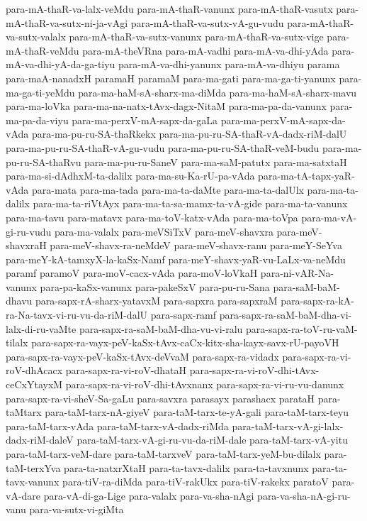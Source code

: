 {para-mA-thaR-va-lalx-veMdu
para-mA-thaR-vanunx
para-mA-thaR-vasutx
para-mA-thaR-va-sutx-ni-ja-vAgi
para-mA-thaR-va-sutx-vA-gu-vudu
para-mA-thaR-va-sutx-valalx
para-mA-thaR-va-sutx-vanunx
para-mA-thaR-va-sutx-vige
para-mA-thaR-veMdu
para-mA-theVRna
para-mA-vadhi
para-mA-va-dhi-yAda
para-mA-va-dhi-yA-da-ga-tiyu
para-mA-va-dhi-yanunx
para-mA-va-dhiyu
parama
para-maA-nanadxH
paramaH
paramaM
para-ma-gati
para-ma-ga-ti-yanunx
para-ma-ga-ti-yeMdu
para-ma-haM-sA-sharx-ma-diMda
para-ma-haM-sA-sharx-mavu
para-ma-loVka
para-ma-na-natx-tAvx-dagx-NitaM
para-ma-pa-da-vanunx
para-ma-pa-da-viyu
para-ma-perxV-mA-sapx-da-gaLa
para-ma-perxV-mA-sapx-da-vAda
para-ma-pu-ru-SA-thaRkekx
para-ma-pu-ru-SA-thaR-vA-dadx-riM-dalU
para-ma-pu-ru-SA-thaR-vA-gu-vudu
para-ma-pu-ru-SA-thaR-veM-budu
para-ma-pu-ru-SA-thaRvu
para-ma-pu-ru-SaneV
para-ma-saM-patutx
para-ma-satxtaH
para-ma-si-dAdhxM-ta-dalilx
para-ma-su-Ka-rU-pa-vAda
para-ma-tA-tapx-yaR-vAda
para-mata
para-ma-tada
para-ma-ta-daMte
para-ma-ta-dalUlx
para-ma-ta-dalilx
para-ma-ta-riVtAyx
para-ma-ta-sa-mamx-ta-vA-gide
para-ma-ta-vanunx
para-ma-tavu
para-matavx
para-ma-toV-katx-vAda
para-ma-toVpa
para-ma-vA-gi-ru-vudu
para-ma-valalx
para-meVSiTxV
para-meV-shavxra
para-meV-shavxraH
para-meV-shavx-ra-neMdeV
para-meV-shavx-ranu
para-meY-SeYva
para-meY-kA-tamxyX-la-kaSx-Namf
para-meY-shavx-yaR-vu-LaLx-va-neMdu
paramf
paramoV
para-moV-cacx-vAda
para-moV-loVkaH
para-ni-vAR-Na-vanunx
para-pa-kaSx-vanunx
para-pakeSxV
para-pu-ru-Sana
para-saM-baM-dhavu
para-sapx-rA-sharx-yatavxM
para-sapxra
para-sapxraM
para-sapx-ra-kA-ra-Na-tavx-vi-ru-vu-da-riM-dalU
para-sapx-ramf
para-sapx-ra-saM-baM-dha-vi-lalx-di-ru-vaMte
para-sapx-ra-saM-baM-dha-vu-vi-ralu
para-sapx-ra-toV-ru-vaM-tilalx
para-sapx-ra-vayx-peV-kaSx-tAvx-caCx-kitx-sha-kayx-savx-rU-payoVH
para-sapx-ra-vayx-peV-kaSx-tAvx-deVvaM
para-sapx-ra-vidadx
para-sapx-ra-vi-roV-dhAcacx
para-sapx-ra-vi-roV-dhataH
para-sapx-ra-vi-roV-dhi-tAvx-ceCxYtayxM
para-sapx-ra-vi-roV-dhi-tAvxnanx
para-sapx-ra-vi-ru-vu-danunx
para-sapx-ra-vi-sheV-Sa-gaLu
para-savxra
parasayx
parashacx
parataH
para-taMtarx
para-taM-tarx-nA-giyeV
para-taM-tarx-te-yA-gali
para-taM-tarx-teyu
para-taM-tarx-vAda
para-taM-tarx-vA-dadx-riMda
para-taM-tarx-vA-gi-lalx-dadx-riM-daleV
para-taM-tarx-vA-gi-ru-vu-da-riM-dale
para-taM-tarx-vA-yitu
para-taM-tarx-veM-dare
para-taM-tarxveV
para-taM-tarx-yeM-bu-dilalx
para-taM-terxYva
para-ta-natxrXtaH
para-ta-tavx-dalilx
para-ta-tavxnunx
para-ta-tavx-vanunx
para-tiV-ra-diMda
para-tiV-rakUkx
para-tiV-rakekx
paratoV
para-vA-dare
para-vA-di-ga-Lige
para-valalx
para-va-sha-nAgi
para-va-sha-nA-gi-ru-vanu
para-va-sutx-vi-giMta
}

